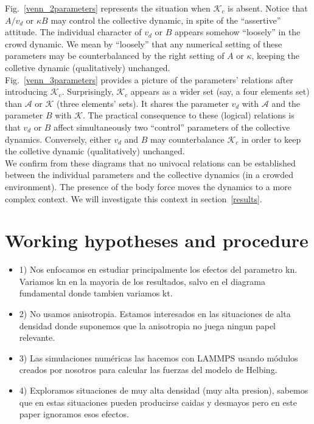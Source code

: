 \documentclass[preprint,12pt]{elsarticle}
\begin{document}
Fig.~\ref{venn_2parameters} represents the situation when $\mathcal{K}_c$ is 
absent. Notice that $A/v_d$ or $\kappa B$ may control the collective 
dynamic, in spite of the ``assertive'' attitude. The individual character of 
$v_d$ or $B$ appears somehow ``loosely'' in the crowd dynamic. We mean by 
``loosely'' that any numerical setting of these parameters may be 
counterbalanced by the right setting of $A$ or $\kappa$, keeping the 
colletive dynamic (qualitatively) unchanged.  \\

Fig.~\ref{venn_3parameters} provides a picture of the parameters' relations 
after introducing $\mathcal{K}_c$. Surprisingly, $\mathcal{K}_c$ appears as a
wider set (say, a four elements set) than $\mathcal{A}$ or $\mathcal{K}$ (three 
elements' sets). It shares the parameter $v_d$ with $\mathcal{A}$ and the 
parameter $B$ with $\mathcal{K}$. The practical consequence to these (logical)
relations is that $v_d$ or $B$ affect simultaneously two ``control'' parameters 
of the collective dynamics. Conversely, either $v_d$ and $B$ may counterbalance 
$\mathcal{K}_c$ in order to keep the colletive dynamic (qualitatively) 
unchanged.  \\

We confirm from these diagrams that no univocal relations can be established 
between the individual parameters and the collective dynamics (in a crowded 
environment). The presence of the body force moves the dynamics to a more 
complex context. We will investigate this context in section~\ref{results}. \\



\section{\label{hypotheses}Working hypotheses and procedure}


\begin{itemize}

\item 1)  Nos enfocamos en estudiar principalmente los efectos del parametro kn. Variamos kn en la mayoria de los resultados, salvo en el diagrama fundamental donde tambien variamos kt.

\item 2)  No usamos anisotropia. Estamos interesados en las situaciones de alta densidad donde suponemos que la anisotropia no juega ningun papel relevante.

\item 3) Las simulaciones numéricas las hacemos con LAMMPS usando módulos creados por nosotros para calcular las fuerzas del modelo de Helbing. 

\item 4) Exploramos situaciones de muy alta densidad (muy alta presion), sabemos que en estas situaciones pueden producirse caidas y desmayos pero en este paper ignoramos esos efectos.

\end{itemize}
\end{document}
